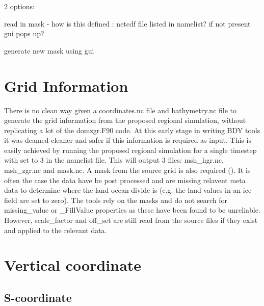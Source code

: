 2 options:

read in mask - how is this defined : netcdf file listed in namelist? if not present gui pops up?

generate new mask using gui


\section{Grid Information}
\label{s_coord}

There is no clean way given a coordinates.nc file and bathymetry.nc file to generate the grid information
from the proposed regional simulation, without replicating a lot of the domzgr.F90  code. At this early stage
in writing BDY tools it was deamed cleaner and safer if this information is required as input. This is easily
achieved by running the proposed regional simulation for a single timestep with  set to 3 in the
\NEMO namelist file. This will output 3 files: msh\_hgr.nc, msh\_zgr.nc and mask.nc.
A mask from the source grid is also required (). It is often the case the data have
be post processed and are missing relavent meta data to determine where the land ocean divide
is (e.g. the land values in an ice field are set to zero). The tools rely on the masks and do not
search for missing\_value or \_FillValue properties as these have been found to be unreliable.
However, scale\_factor and off\_set are still read from the source files if they exist and applied to
the relevant data.

\section{Vertical coordinate}
\label{vert_coord}




\subsection{S-coordinate}
\label{s_coord}



